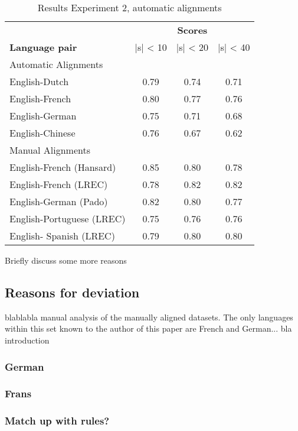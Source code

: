 \documentclass{report}
\begin{document}
\begin{table}[!h]
\centering
\begin{tabular}{l|ccc}
& \multicolumn{3}{c}{\textbf{Scores}}\\
\textbf{Language pair} & |s| < 10 & |s| < 20 & |s| < 40\\
\hline
\multicolumn{4}{l}{Automatic Alignments}\\
\hline
English-Dutch & 0.79 & 0.74 & 0.71 \\
English-French & 0.80 & 0.77 & 0.76\\
English-German & 0.75 & 0.71 & 0.68 \\
English-Chinese & 0.76 & 0.67 & 0.62\\
\hline
\multicolumn{4}{l}{Manual Alignments}\\
\hline
English-French (Hansard) & 0.85 & 0.80 & 0.78 \\
English-French (LREC) & 0.78 & 0.82 & 0.82 \\
English-German (Pado) & 0.82 & 0.80 & 0.77 \\
English-Portuguese (LREC) & 0.75 & 0.76 & 0.76 \\
English- Spanish (LREC) & 0.79 & 0.80 & 0.80\\
\end{tabular}
\caption{Results Experiment 2, automatic alignments}\label{tab:scores3}
\end{table}




Briefly discuss some more reasons

\subsection{Reasons for deviation}

blablabla manual analysis of the manually aligned datasets. The only languages within this set known to the author of this paper are French and German... bla introduction

\subsubsection{German}

\subsubsection{Frans}

\subsubsection{Match up with rules?}
\end{document}

